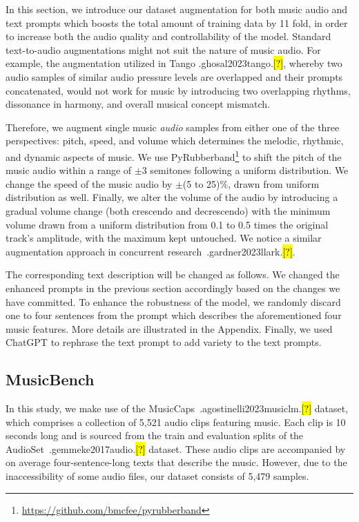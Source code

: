 \documentclass[11pt]{article}
\let\realcite\cite
\renewcommand{\cite}[1]{\ifx.#1.\hl{[?]}\else\realcite{#1}\fi}
\begin{document}
In this section, we introduce our dataset augmentation for both music audio and text prompts which boosts the total amount of training data by 11 fold, in order to increase both the audio quality and controllability of the model. Standard text-to-audio augmentations might not suit the nature of music audio. For example, the augmentation utilized in Tango \cite{ghosal2023tango}, whereby two audio samples of similar audio pressure levels are overlapped and their prompts concatenated, would not work for music by introducing two overlapping rhythms, dissonance in harmony, and overall musical concept mismatch.





Therefore, we augment single music \textit{audio} samples from either one of the three perspectives: pitch, speed, and volume which determines the melodic, rhythmic, and dynamic aspects of music. We use PyRubberband\footnote{\url{https://github.com/bmcfee/pyrubberband}} to shift the pitch of the music audio within a range of $\pm$3 semitones following a uniform distribution. We change the speed of the music audio by $\pm$(5 to 25)\%, drawn from uniform distribution as well. Finally, we alter the volume of the audio by introducing a gradual volume change (both crescendo and decrescendo) with the minimum volume drawn from a uniform distribution from 0.1 to 0.5 times the original track's amplitude, with the maximum kept untouched. We notice a similar augmentation approach in concurrent research~\cite{gardner2023llark}. 

The corresponding text description will be changed as follows. We changed the enhanced prompts in the previous section accordingly based on the changes we have committed. To enhance the robustness of the model, we randomly discard one to four sentences from the prompt which describes the aforementioned four music features. More details are illustrated in the Appendix. Finally, we used ChatGPT to rephrase the text prompt to add variety to the text prompts. 


\subsection{MusicBench}
In this study, we make use of the MusicCaps~\cite{agostinelli2023musiclm} dataset, which comprises a collection of 5,521 audio clips featuring music. Each clip is 10 seconds long and is sourced from the train and evaluation splits of the AudioSet~\cite{gemmeke2017audio} dataset. These audio clips are accompanied by on average four-sentence-long texts that describe the music. However, due to the inaccessibility of some audio files, our dataset consists of 5,479 samples.
\end{document}
